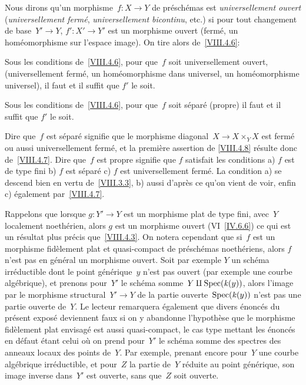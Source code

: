 Nous dirons qu'un morphisme~$f\colon X\to Y$ de pr\'esch\'emas est
\emph{universellement ouvert} (\resp \emph{universellement fermé},
\resp \emph{universellement bicontinu}, etc.)
si pour tout changement de base~$Y'\to Y$, $f'\colon X'\to Y'$ est un
morphisme ouvert (\resp ferm\'e, \resp un
hom\'eomorphisme
sur l'espace image). On tire alors de~\ref{VIII.4.6}:

\begin{corollaire}
\label{VIII.4.7}
Sous
les conditions de~\ref{VIII.4.6}, pour que~$f$ soit
universellement ouvert, (\resp universellement ferm\'e, \resp un
hom\'eomorphisme dans universel, \resp un hom\'eomorphisme
universel), il faut et il suffit que $f'$ le soit.
\end{corollaire}

\begin{corollaire}
\label{VIII.4.8}
Sous les conditions de~\ref{VIII.4.6}, pour que~$f$ soit
s\'epar\'e (\resp propre) il faut et il suffit que $f'$ le soit.
\end{corollaire}

Dire que~$f$ est s\'epar\'e signifie que le morphisme
diagonal~$X\to X\times_{Y}X$ est ferm\'e ou aussi universellement
ferm\'e, et la premi\`ere assertion
de
\ref{VIII.4.8} r\'esulte donc de~\ref{VIII.4.7}. Dire que~$f$ est
propre signifie que $f$ satisfait les conditions a) $f$ est de type
fini b) $f$ est s\'epar\'e c) $f$ est universellement
ferm\'e. La condition a) se descend bien en vertu de~\ref{VIII.3.3},
b) aussi d'apr\`es ce qu'on vient de voir, enfin c) \'egalement
par~\ref{VIII.4.7}.

\begin{remarques}
\label{VIII.4.9}
Rappelons que lorsque $g\colon Y'\to Y$ est un morphisme plat de type
fini, avec~$Y$ localement noeth\'erien, alors $g$ est un morphisme
ouvert (VI~\ref{IV.6.6}) ce qui est un r\'esultat plus
pr\'ecis que~\ref{VIII.4.3}. On notera cependant que si~$f$ est un
morphisme fid\`element plat et quasi-compact de pr\'esch\'emas
noeth\'eriens, alors $f$ n'est pas en g\'en\'eral un morphisme
ouvert. Soit par exemple $Y$ un sch\'ema irr\'eductible dont le
point g\'en\'erique~$y$ n'est pas ouvert (par exemple une courbe
alg\'ebrique), et prenons pour~$Y'$ le sch\'ema somme~$Y\amalg
\operatorname{Spec}(\mathit{k}(y))$, alors l'image par le morphisme structural~$Y'\to Y$ de
la partie ouverte~$\operatorname{Spec}(\mathit{k}(y))$ n'est pas une partie ouverte
de~$Y$. Le lecteur remarquera \'egalement que divers \'enonc\'es
du pr\'esent expos\'e deviennent faux si on y abandonne
l'hypoth\`ese que le morphisme fid\`element plat envisag\'e est
aussi quasi-compact, le cas type mettant les \'enonc\'es en
d\'efaut \'etant celui o\`u on prend pour~$Y'$ le sch\'ema
somme des spectres des anneaux locaux des points de~$Y$. Par exemple,
prenant encore pour~$Y$ une courbe alg\'ebrique irr\'eductible, et
pour~$Z$ la partie de~$Y$ r\'eduite au point g\'en\'erique, son
image inverse dans~$Y'$ est ouverte, sans que~$Z$ soit ouverte.
\end{remarques}


